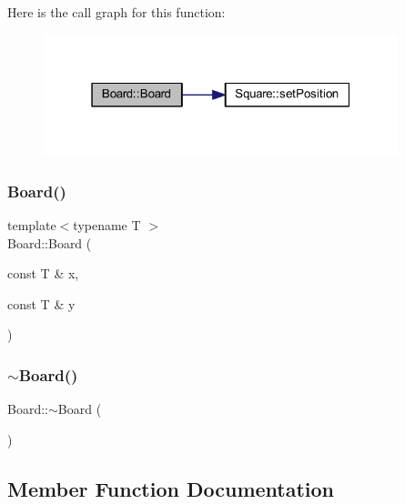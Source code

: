 Here is the call graph for this function\+:
\nopagebreak
\begin{figure}[H]
\begin{center}
\leavevmode
\includegraphics[width=292pt]{class_board_a3ab3bc5a15b6f8fb4aa8473fed2afdcb_cgraph}
\end{center}
\end{figure}
\mbox{\label{class_board_abda1ce2449776e76715fc7b59c912935}} 
\subsubsection{\texorpdfstring{Board()}{Board()}\hspace{0.1cm}{\footnotesize\ttfamily [3/3]}}
{\footnotesize\ttfamily template$<$typename T $>$ \\
Board\+::\+Board (\begin{DoxyParamCaption}\item[{const T \&}]{x,  }\item[{const T \&}]{y }\end{DoxyParamCaption})}

\mbox{\label{class_board_af73f45730119a1fd8f6670f53f959e68}} 
\subsubsection{\texorpdfstring{$\sim$\+Board()}{~Board()}}
{\footnotesize\ttfamily Board\+::$\sim$\+Board (\begin{DoxyParamCaption}{ }\end{DoxyParamCaption})}



\subsection{Member Function Documentation}
\mbox{\label{class_board_ac7ec911a62371650afd340d1535a1742}} 
